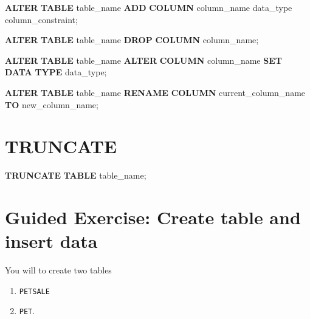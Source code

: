 \documentclass[
]{book}
\newenvironment{Shaded}{\begin{snugshade}}{\end{snugshade}}
\newcommand{\KeywordTok}[1]{\textcolor[rgb]{0.13,0.29,0.53}{\textbf{#1}}}
\newcommand{\NormalTok}[1]{#1}
\begin{document}
\begin{Shaded}
\begin{Highlighting}[]
\KeywordTok{ALTER} \KeywordTok{TABLE}\NormalTok{ table\_name}
\KeywordTok{ADD} \KeywordTok{COLUMN}\NormalTok{ column\_name data\_type column\_constraint;}

\KeywordTok{ALTER} \KeywordTok{TABLE}\NormalTok{ table\_name}
\KeywordTok{DROP} \KeywordTok{COLUMN}\NormalTok{ column\_name;}

\KeywordTok{ALTER} \KeywordTok{TABLE}\NormalTok{ table\_name}
\KeywordTok{ALTER} \KeywordTok{COLUMN}\NormalTok{ column\_name }\KeywordTok{SET} \KeywordTok{DATA} \KeywordTok{TYPE}\NormalTok{ data\_type;}

\KeywordTok{ALTER} \KeywordTok{TABLE}\NormalTok{ table\_name}
\KeywordTok{RENAME} \KeywordTok{COLUMN}\NormalTok{ current\_column\_name }\KeywordTok{TO}\NormalTok{ new\_column\_name;}
\end{Highlighting}
\end{Shaded}

\hypertarget{truncate}{%
\section{TRUNCATE}\label{truncate}}

\begin{Shaded}
\begin{Highlighting}[]
\KeywordTok{TRUNCATE} \KeywordTok{TABLE}\NormalTok{ table\_name;}
\end{Highlighting}
\end{Shaded}

\hypertarget{guided-exercise-create-table-and-insert-data}{%
\section{Guided Exercise: Create table and insert data}\label{guided-exercise-create-table-and-insert-data}}

You will to create two tables

\begin{enumerate}
\def\labelenumi{\arabic{enumi}.}
\item
  \texttt{PETSALE}
\item
  \texttt{PET}.
\end{enumerate}
\end{document}
